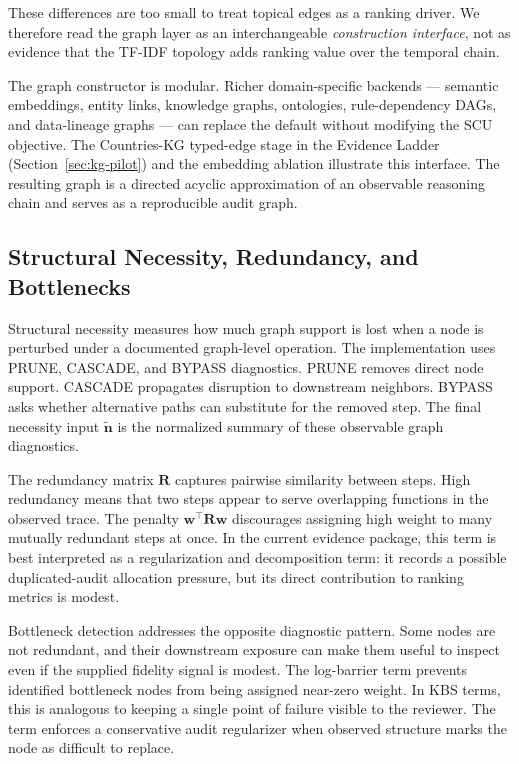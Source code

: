 \documentclass[a4paper,fleqn]{cas-sc}
\begin{document}
These differences are too small to treat topical edges as a ranking driver. We therefore read the graph layer as an interchangeable \emph{construction interface}, not as evidence that the TF-IDF topology adds ranking value over the temporal chain.

The graph constructor is modular. Richer domain-specific backends --- semantic embeddings, entity links, knowledge graphs, ontologies, rule-dependency DAGs, and data-lineage graphs --- can replace the default without modifying the SCU objective. The Countries-KG typed-edge stage in the Evidence Ladder (Section~\ref{sec:kg-pilot}) and the embedding ablation illustrate this interface. The resulting graph is a directed acyclic approximation of an observable reasoning chain and serves as a reproducible audit graph.

\subsection{Structural Necessity, Redundancy, and Bottlenecks}

Structural necessity measures how much graph support is lost when a node is perturbed under a documented graph-level operation. The implementation uses PRUNE, CASCADE, and BYPASS diagnostics. PRUNE removes direct node support. CASCADE propagates disruption to downstream neighbors. BYPASS asks whether alternative paths can substitute for the removed step. The final necessity input $\tilde{\mathbf{n}}$ is the normalized summary of these observable graph diagnostics.

The redundancy matrix $\mathbf{R}$ captures pairwise similarity between steps. High redundancy means that two steps appear to serve overlapping functions in the observed trace. The penalty $\mathbf{w}^{\top}\mathbf{R}\mathbf{w}$ discourages assigning high weight to many mutually redundant steps at once. In the current evidence package, this term is best interpreted as a regularization and decomposition term: it records a possible duplicated-audit allocation pressure, but its direct contribution to ranking metrics is modest.

Bottleneck detection addresses the opposite diagnostic pattern. Some nodes are not redundant, and their downstream exposure can make them useful to inspect even if the supplied fidelity signal is modest. The log-barrier term prevents identified bottleneck nodes from being assigned near-zero weight. In KBS terms, this is analogous to keeping a single point of failure visible to the reviewer. The term enforces a conservative audit regularizer when observed structure marks the node as difficult to replace.
\end{document}
